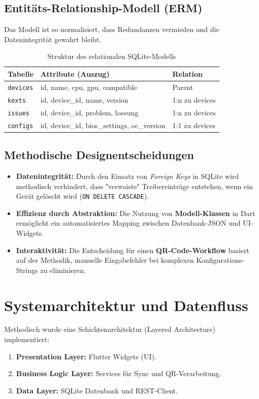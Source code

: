 \subsection{Entitäts-Relationship-Modell (ERM)}
Das Modell ist so normalisiert, dass Redundanzen vermieden und die Datenintegrität gewahrt bleibt.

\begin{table}[h!]
\centering
\begin{tabular}{l l l}
\hline
\textbf{Tabelle} & \textbf{Attribute (Auszug)} & \textbf{Relation} \\
\hline
\texttt{devices} & id, name, cpu, gpu, compatible & Parent \\
\texttt{kexts} & id, device\_id, name, version & 1:n zu devices \\
\texttt{issues} & id, device\_id, problem, loesung & 1:n zu devices \\
\texttt{configs} & id, device\_id, bios\_settings, oc\_version & 1:1 zu devices \\
\hline
\end{tabular}
\caption{Struktur des relationalen SQLite-Modells}
\end{table}

\subsection{Methodische Designentscheidungen}
\begin{itemize}
    \item \textbf{Datenintegrität:} Durch den Einsatz von \textit{Foreign Keys} in SQLite wird methodisch verhindert, dass "verwaiste" Treibereinträge entstehen, wenn ein Gerät gelöscht wird (\texttt{ON DELETE CASCADE}).
    \item \textbf{Effizienz durch Abstraktion:} Die Nutzung von \textbf{Modell-Klassen} in Dart ermöglicht ein automatisiertes Mapping zwischen Datenbank-JSON und UI-Widgets.
    \item \textbf{Interaktivität:} Die Entscheidung für einen \textbf{QR-Code-Workflow} basiert auf der Methodik, manuelle Eingabefehler bei komplexen Konfigurations-Strings zu eliminieren.
\end{itemize}

\section{Systemarchitektur und Datenfluss}
Methodisch wurde eine Schichtenarchitektur (Layered Architecture) implementiert:
\begin{enumerate}
    \item \textbf{Presentation Layer:} Flutter Widgets (UI).
    \item \textbf{Business Logic Layer:} Services für Sync und QR-Verarbeitung.
    \item \textbf{Data Layer:} SQLite Datenbank und REST-Client.
\end{enumerate}

